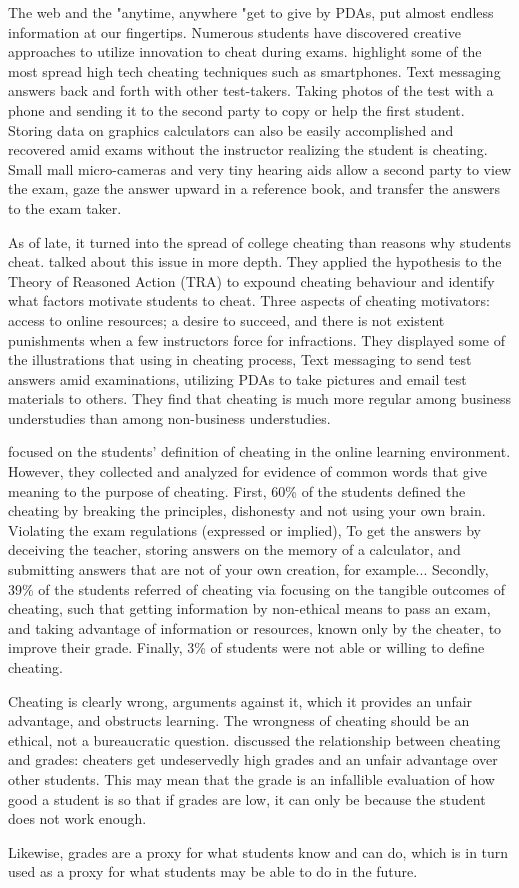 The web and the "anytime, anywhere "get to give by PDAs, put almost endless information at our fingertips.
Numerous students have discovered creative approaches to utilize innovation to cheat during exams.
 highlight some of the most spread high tech cheating techniques such as smartphones.
Text messaging answers back and forth with other test-takers.
Taking photos of the test with a phone and sending it to the second party to copy or help the first student.
Storing data on graphics calculators can also be easily accomplished and recovered amid exams without the instructor realizing the student is cheating.
Small mall micro-cameras and very tiny hearing aids allow a second party to view the exam, gaze the answer upward in a reference book, and transfer the answers to the exam taker.

As of late, it turned into the spread of college cheating than reasons why students cheat.
 talked about this issue in more depth.
They applied the hypothesis to the Theory of Reasoned Action (TRA) to expound cheating behaviour and identify what factors motivate students to cheat.
Three aspects of cheating motivators: access to online resources; a desire to succeed, and there is not existent punishments when a few instructors force for infractions.
They displayed some of the illustrations that using in cheating process, Text messaging to send test answers amid examinations, utilizing PDAs to take pictures and email test materials to others.
They find that cheating is much more regular among business understudies than among non-business understudies.

 focused on the students' definition of cheating in the online learning environment.
However, they collected and analyzed for evidence of common words that give meaning to the purpose of cheating.
First, 60\% of the students defined the cheating by breaking the principles, dishonesty and not using your own brain.
Violating the exam regulations (expressed or implied), To get the answers by deceiving the teacher, storing answers on the memory of a calculator, and submitting answers that are not of your own creation, for example...
Secondly, 39\% of the students referred of cheating via focusing on the tangible outcomes of cheating, such that getting information by non-ethical means to pass an exam, and taking advantage of information or resources, known only by the cheater, to improve their grade.
Finally, 3\% of students were not able or willing to define cheating.

Cheating is clearly wrong, arguments against it, which it provides an unfair advantage, and obstructs learning.
The wrongness of cheating should be an ethical, not a bureaucratic question.
 discussed the relationship between cheating and grades: cheaters get undeservedly high grades and an unfair advantage over other students.
This may mean that the grade is an infallible evaluation of how good a student is so that if grades are low, it can only be because the student does not work enough.

Likewise, grades are a proxy for what students know and can do, which is in turn used as a proxy for what students may be able to do in the future.
